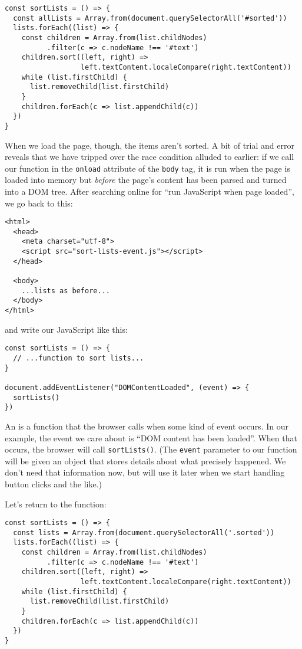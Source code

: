 \begin{verbatim}
const sortLists = () => {
  const allLists = Array.from(document.querySelectorAll('#sorted'))
  lists.forEach((list) => {
    const children = Array.from(list.childNodes)
          .filter(c => c.nodeName !== '#text')
    children.sort((left, right) =>
                  left.textContent.localeCompare(right.textContent))
    while (list.firstChild) {
      list.removeChild(list.firstChild)
    }
    children.forEach(c => list.appendChild(c))
  })
}
\end{verbatim}

When we load the page,
though,
the items aren't sorted.
A bit of trial and error reveals that we have tripped over the race condition alluded to earlier:
if we call our function in the \texttt{onload} attribute of the \texttt{body} tag,
it is run when the page is loaded into memory
but \emph{before} the page's content has been parsed and turned into a DOM tree.
After searching online for ``run JavaScript when page loaded'',
we go back to this:

\begin{verbatim}
<html>
  <head>
    <meta charset="utf-8">
    <script src="sort-lists-event.js"></script>
  </head>

  <body>
    ...lists as before...
  </body>
</html>
\end{verbatim}

\noindent
and write our JavaScript like this:

\begin{verbatim}
const sortLists = () => {
  // ...function to sort lists...
}

document.addEventListener("DOMContentLoaded", (event) => {
  sortLists()
})
\end{verbatim}

An  is a function that the browser calls
when some kind of event occurs.
In our example,
the event we care about is ``DOM content has been loaded''.
When that occurs,
the browser will call \texttt{sortLists()}.
(The \texttt{event} parameter to our function will be given an object
that stores details about what precisely happened.
We don't need that information now,
but will use it later when we start handling button clicks and the like.)

Let's return to the function:

\begin{verbatim}
const sortLists = () => {
  const lists = Array.from(document.querySelectorAll('.sorted'))
  lists.forEach((list) => {
    const children = Array.from(list.childNodes)
          .filter(c => c.nodeName !== '#text')
    children.sort((left, right) =>
                  left.textContent.localeCompare(right.textContent))
    while (list.firstChild) {
      list.removeChild(list.firstChild)
    }
    children.forEach(c => list.appendChild(c))
  })
}
\end{verbatim}

